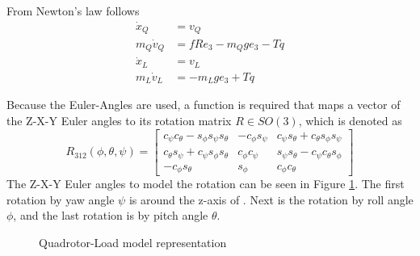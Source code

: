 From Newton's law follows
\begin{equation}\label{eq:newton}
\begin{aligned}
\dot{x}_Q &= v_Q\\
m_Q\dot{v}_Q &=fRe_3-m_Qge_3-Tq\\
\dot{x}_L &= v_L\\
m_L\dot{v}_L &=-m_Lge_3+Tq
\end{aligned}
\end{equation}


Because the Euler-Angles are used, a function is required that maps a vector of the Z-X-Y Euler angles to its rotation matrix $ R\in SO(3) $, which is denoted as \cite{Mahony2012}
\begin{equation}\label{key}
R_{312}({\phi},{\theta},{\psi})=\begin{bmatrix}
c_{\psi}c_{\theta}-s_{\phi}s_{\psi}s_{\theta}&-c_{\phi}s_{\psi}&c_{\psi}s_{\theta}+c_{\theta}s_{\phi}s_{\psi}\\
c_{\theta}s_{\psi}+c_{\psi}s_{\phi}s_{\theta}&c_{\phi}c_{\psi}&s_{\psi}s_{\theta}-c_{\psi}c_{\theta}s_{\phi}\\
-c_{\phi}s_{\theta}&s_{\phi}&c_{\phi}c_{\theta}
\end{bmatrix}
\end{equation}
The Z-X-Y Euler angles to model the rotation can be seen in Figure \ref{fig:mod.modelQRtrad}. The first rotation by yaw angle $ \psi $ is around the z-axis of \IF. Next is the rotation by roll angle $ \phi $, and the last rotation is by pitch angle $ \theta $.
\begin{figure}[h!]
	\centering
	\caption{Quadrotor-Load model representation\label{fig:mod.modelQRtrad}}
\end{figure}

